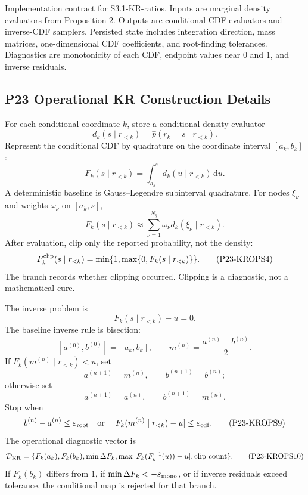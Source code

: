 \documentclass[11pt]{article}
\newcommand{\dd}{\,\mathrm d}
\begin{document}
Implementation contract for S3.1-KR-ratios.  Inputs are marginal density
evaluators from Proposition 2.  Outputs are conditional CDF evaluators and
inverse-CDF samplers.  Persisted state includes integration direction, mass
matrices, one-dimensional CDF coefficients, and root-finding tolerances.
Diagnostics are monotonicity of each CDF, endpoint values near \(0\) and \(1\),
and inverse residuals.

\subsection*{P23 Operational KR Construction Details}

For each conditional coordinate \(k\), store a conditional density evaluator
\[
    d_k(s\mid r_{<k})
    =
    \widehat p(r_k=s\mid r_{<k}).
    \tag{P23-KROPS1}
\]
Represent the conditional CDF by quadrature on the coordinate interval
\([a_k,b_k]\):
\[
    F_k(s\mid r_{<k})
    =
    \int_{a_k}^{s}d_k(u\mid r_{<k})\dd u.
    \tag{P23-KROPS2}
\]
A deterministic baseline is Gauss--Legendre subinterval quadrature.  For nodes
\(\xi_\nu\) and weights \(\omega_\nu\) on \([a_k,s]\),
\[
    F_k(s\mid r_{<k})
    \approx
    \sum_{\nu=1}^{N_q}\omega_\nu d_k(\xi_\nu\mid r_{<k}).
    \tag{P23-KROPS3}
\]
After evaluation, clip only the reported probability, not the density:
\[
    F_k^{\rm clip}(s\mid r_{<k})
    =
    \min\{1,\max\{0,F_k(s\mid r_{<k})\}\}.
    \tag{P23-KROPS4}
\]
The branch records whether clipping occurred.  Clipping is a diagnostic, not a
mathematical cure.

The inverse problem is
\[
    F_k(s\mid r_{<k})-u=0.
    \tag{P23-KROPS5}
\]
The baseline inverse rule is bisection:
\[
    [a^{(0)},b^{(0)}]=[a_k,b_k],
    \qquad
    m^{(n)}=\frac{a^{(n)}+b^{(n)}}2.
    \tag{P23-KROPS6}
\]
If \(F_k(m^{(n)}\mid r_{<k})<u\), set
\[
    a^{(n+1)}=m^{(n)},\qquad b^{(n+1)}=b^{(n)};
    \tag{P23-KROPS7}
\]
otherwise set
\[
    a^{(n+1)}=a^{(n)},\qquad b^{(n+1)}=m^{(n)}.
    \tag{P23-KROPS8}
\]
Stop when
\[
    b^{(n)}-a^{(n)}\le \varepsilon_{\rm root}
    \quad\text{or}\quad
    |F_k(m^{(n)}\mid r_{<k})-u|\le \varepsilon_{\rm cdf}.
    \tag{P23-KROPS9}
\]
The operational diagnostic vector is
\[
    \mathcal D_{\rm KR}
    =
    \{F_k(a_k),F_k(b_k),\min\Delta F_k,
      \max|F_k(F_k^{-1}(u))-u|,\text{clip count}\}.
    \tag{P23-KROPS10}
\]
If \(F_k(b_k)\) differs from \(1\), if \(\min\Delta F_k<-\varepsilon_{\rm mono}\),
or if inverse residuals exceed tolerance, the conditional map is rejected for
that branch.
\end{document}
